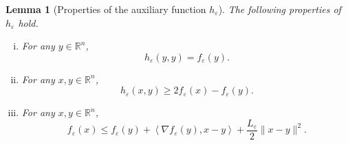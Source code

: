 \documentclass[11pt]{article}
\numberwithin{equation}{section}
\newtheorem{lemma}{Lemma}[proposition]
\begin{document}
\begin{lemma} [Properties of the auxiliary function $h_{\varepsilon}$]\label{State_h_prop}
The following properties of $h_{\varepsilon}$ hold.
\begin{enumerate}[(i)]
	\item For any $y \in \mathbb{R}^n$, \label{State_h_prop1}
	\begin{equation*}
		h_{\varepsilon}(y,y) = f_{\varepsilon}(y) .
	\end{equation*}
	\item For any $x,y \in \mathbb{R}^n$, \label{State_h_prop2}
	\begin{equation*}
		h_{\varepsilon}(x,y) \geq 2f_{\varepsilon}(x) - f_{\varepsilon}(y) .
	\end{equation*}
	\item For any $x,y \in \mathbb{R}^n$, \label{State_h_prop4}
	\begin{equation*}
		f_{\varepsilon}(x) \leq f_{\varepsilon}(y) + \left\langle \nabla f_{\varepsilon}(y), x-y \right\rangle + \frac{L_{\varepsilon}}{2}\|x-y\|^2 .
	\end{equation*}
\end{enumerate}
\end{lemma}
\end{document}
